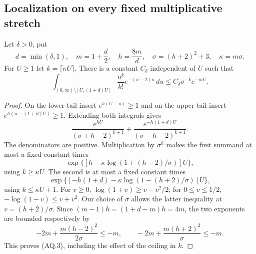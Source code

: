 \subsection{Localization on every fixed multiplicative stretch}

\begin{lemma}
\label{claim:AQ2}
Let $\delta>0$, put
\[
 d=\min(\delta,1),\quad m=1+\frac d2,\quad
 h=\frac{8m}{d},\quad \sigma=(h+2)^2+3,\quad \kappa=m\sigma.
\]
For $U\ge1$ let $k=\lceil\kappa U\rceil$.  There is a constant
$C_\delta$ independent of $U$ such that
\[
 \int_{(0,\infty)\setminus[U,(1+d)U]}
       \frac{u^k}{k!}e^{-(\sigma-2)u}\,du
       \le C_\delta\sigma^{-k}e^{-mU}.
 \tag{AQ.3}
\]
\end{lemma}
\begin{proof}
On the lower tail insert $e^{h(U-u)}\ge1$ and on the upper tail
insert $e^{h(u-(1+d)U)}\ge1$.  Extending both integrals gives
\[
 \frac{e^{hU}}{(\sigma+h-2)^{k+1}}
 +\frac{e^{-h(1+d)U}}{(\sigma-h-2)^{k+1}}.       \tag{AQ.4}
\]
The denominators are positive.  Multiplication by $\sigma^k$ makes
the first summand at most a fixed constant times
\[
 \exp\{[h-\kappa\log(1+(h-2)/\sigma)]U\},
\]
using $k\ge\kappa U$.  The second is at most a fixed constant times
\[
 \exp\{[-h(1+d)-\kappa\log(1-(h+2)/\sigma)]U\},
\]
using $k\le\kappa U+1$.  For $v\ge0$,
$\log(1+v)\ge v-v^2/2$; for $0\le v\le1/2$,
$-\log(1-v)\le v+v^2$.  Our choice of $\sigma$ allows the latter
inequality at $v=(h+2)/\sigma$.  Since
$(m-1)h=(1+d-m)h=4m$, the two exponents are bounded respectively by
\[
 -2m+\frac{m(h-2)^2}{2\sigma}\le-m,
 \qquad
 -2m+\frac{m(h+2)^2}{\sigma}\le-m.
\]
This proves (AQ.3), including the effect of the ceiling in $k$.
\end{proof}

